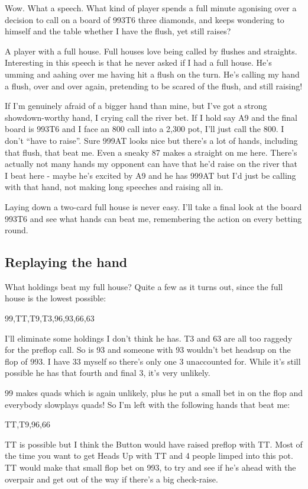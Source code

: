 Wow. What a speech. What kind of player spends a full minute agonising
over a decision to call on a board of 993T6 three diamonds, and keeps
wondering to himself and the table whether I have the flush, yet still
raises?

A player with a full house. Full houses love being called by flushes
and straights. Interesting in this speech is that he never asked
if I had a full house. He's umming and aahing over me having
hit a flush on the turn. He's calling my hand a flush, over and over
again, pretending to be scared of the flush, and still raising!

If I'm genuinely afraid of a bigger hand than mine, but I've
got a strong showdown-worthy hand, I crying call the river bet.
If I hold say A9 and the final board is 993T6 and I face an 800 call into
a 2,300 pot, I'll just call the 800. I don't ``have to raise''. Sure
999AT looks nice but there's a lot of hands, including that flush,
that beat me. Even a sneaky 87 makes a straight on me here. There's
actually not many hands my opponent can have that he'd raise on the
river that I beat here - maybe he's excited by A9 and he has 999AT but
I'd just be calling with that hand,
not making long speeches and raising all in.

Laying down a two-card full house is never easy. I'll take a final look
at the board 993T6 and see what hands can beat me, remembering the
action on every betting round.

\subsection{Replaying the hand}

What holdings beat my full house? Quite a few as it turns out, since
the full house is the lowest possible:

99,TT,T9,T3,96,93,66,63

I'll eliminate some holdings I don't think he has. T3 and 63 are
all too raggedy for the preflop call. So is 93 and someone with 93
wouldn't bet headsup on the flop of 993. I have 33 myself so there's
only one 3 unaccounted for. While it's still possible he has that
fourth and final 3, it's very unlikely.

99 makes quads which is again unlikely, plus he put a small bet in
on the flop and everybody slowplays quads! So I'm left with the following
hands that beat me:

TT,T9,96,66

TT is possible but I think the Button would have raised preflop with TT.
Most of the time you want to get Heads Up with TT and 4 people limped
into this pot. TT would make that small flop bet on 993, to try and see
if he's ahead with the overpair and get out of the way if there's a big
check-raise.

